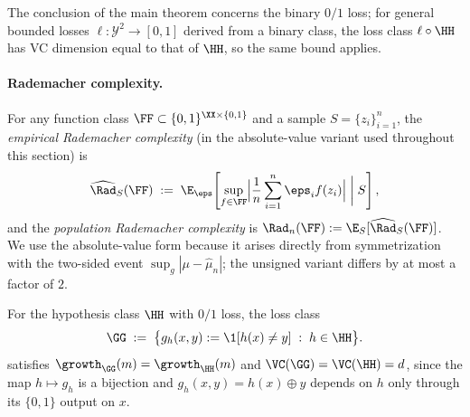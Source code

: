 \begin{remark}\label{rem:zero-one}
The conclusion of the main theorem concerns the binary $0/1$ loss; for general bounded losses $\ell: \mathcal{Y}^2 \to [0,1]$ derived from a binary class, the loss class $\ell \circ \HH$ has VC dimension equal to that of $\HH$, so the same bound applies.
\end{remark}

\paragraph{Rademacher complexity.}

\begin{definition}\label{def:rademacher}
For any function class $\FF \subset \{0,1\}^{\XX \times \{0,1\}}$ and a sample $S = \{z_i\}_{i=1}^n$, the \emph{empirical Rademacher complexity} (in the absolute-value variant used throughout this section) is
\begin{align*}
\widehat{\Rad}_S(\FF) \;:=\; \E_{\eps}\!\left[ \sup_{f \in \FF} \Bigl| \frac{1}{n} \sum_{i=1}^{n} \eps_i f(z_i) \Bigr| \;\bigg|\; S \right],
\end{align*}
and the \emph{population Rademacher complexity} is $\Rad_n(\FF) := \E_{S}[\widehat{\Rad}_S(\FF)]$. We use the absolute-value form because it arises directly from symmetrization with the two-sided event $\sup_g |\mu - \widehat\mu_n|$; the unsigned variant differs by at most a factor of $2$.
\end{definition}

For the hypothesis class $\HH$ with $0/1$ loss, the loss class
\begin{align*}
\GG \;:=\; \bigl\{ g_h(x,y) := \1[h(x) \ne y] \;:\; h \in \HH \bigr\}.
\end{align*}
satisfies $\growth_{\GG}(m) = \growth_{\HH}(m)$ and $\VC(\GG) = \VC(\HH) = d$, since the map $h \mapsto g_h$ is a bijection and $g_h(x,y) = h(x) \oplus y$ depends on $h$ only through its $\{0,1\}$ output on $x$.
